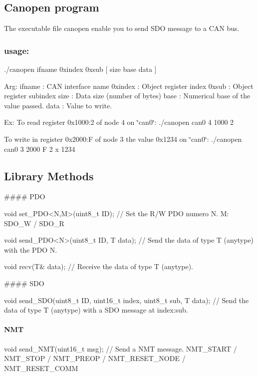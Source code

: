 \subsection*{Canopen program}

The executable file canopen enable you to send S\+DO message to a C\+AN bus. \subsubsection*{usage\+:}

./canopen ifname 0xindex 0xsub \mbox{[} size base data \mbox{]}

Arg\+: ifname \+: C\+AN interface name 0xindex \+: Object register index 0xsub \+: Object register subindex size \+: Data size (number of bytes) base \+: Numerical base of the value passed. data \+: Value to write.

Ex\+: To read register 0x1000\+:2 of node 4 on \char`\"{}can0\char`\"{}\+: ./canopen can0 4 1000 2

To write in register 0x2000\+:F of node 3 the value 0x1234 on \char`\"{}can0\char`\"{}\+: ./canopen can0 3 2000 F 2 x 1234

\subsection*{Library Methods}

\#\#\#\# P\+DO 
\begin{DoxyCode}
\textcolor{keywordtype}{void} set\_PDO<N,M>(uint8\_t ID); \textcolor{comment}{// Set the R/W PDO numero N. M: SDO\_W / SDO\_R}
\end{DoxyCode}
 
\begin{DoxyCode}
\textcolor{keywordtype}{void} send\_PDO<N>(uint8\_t ID, T data); \textcolor{comment}{// Send the data of type T (anytype) with the PDO N.}
\end{DoxyCode}
 
\begin{DoxyCode}
\textcolor{keywordtype}{void} recv(T& data); \textcolor{comment}{// Receive the data of type T (anytype).}
\end{DoxyCode}


\#\#\#\# S\+DO 
\begin{DoxyCode}
\textcolor{keywordtype}{void} send\_SDO(uint8\_t ID, uint16\_t index, uint8\_t sub, T data); \textcolor{comment}{// Send the data of type T (anytype) with a
       SDO message at index:sub.}
\end{DoxyCode}
 \paragraph*{N\+MT}


\begin{DoxyCode}
\textcolor{keywordtype}{void} send\_NMT(uint16\_t msg); \textcolor{comment}{// Send a NMT message. NMT\_START / NMT\_STOP / NMT\_PREOP / NMT\_RESET\_NODE /
       NMT\_RESET\_COMM}
\end{DoxyCode}
 